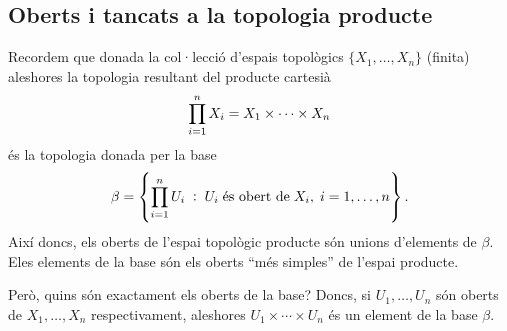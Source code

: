 \documentclass[../main.tex]{subfiles}
\begin{document}
\subsection{Oberts i tancats a la topologia producte}
Recordem que donada la col·lecció d'espais topològics $\{X_1,\ldots,X_n\}$ (finita) aleshores la topologia resultant del producte cartesià
\begin{equation}
    \notag
    \prod_{i=1}^n X_i = X_1\times \cdots\times X_n
\end{equation}
és la topologia donada per la base
\begin{equation}
    \notag
    \beta = \left\{\prod_{i=1}^n U_i\;:\;U_i\;\text{és obert de}\;X_i,\;i=1,\ldots,n\right\}. 
\end{equation}
Així doncs, els oberts de l'espai topològic producte són unions d'elements de $\beta$. Eles elements de la base són els oberts ``més simples'' de l'espai producte.

Però, quins són exactament els oberts de la base? Doncs, si $U_1,\ldots,U_n$ són oberts de $X_1,\ldots,X_n$ respectivament, aleshores $U_1\times \cdots\times U_n$ és un element de la base $\beta$.
\end{document}
